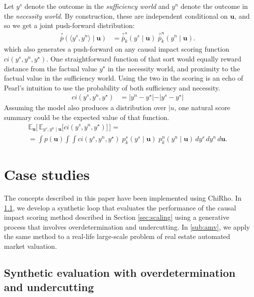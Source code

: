 \documentclass[anon,12pt]{clear2025} %
\begin{document}
Let $y^s$ denote the outcome in the \emph{sufficiency world} and $y^n$ denote the outcome in the \emph{necessity world}. By construction, these are independent conditional on $\mathbf{u}$, and so we get a joint push-forward distribution:
\begin{align}
\overset{?}{p}(\langle y^s, y^n \rangle \mid \mathbf{u})  & = \overset{?}{p}^s_k(y^s \mid \mathbf{u}) \; \overset{?}{p}^n_k(y^n \mid \mathbf{u}).
\end{align}
\noindent which also generates a push-forward on any causal impact scoring function $ci(y^s, y^n, y^\star)$.  One straightforward function of that sort would equally reward distance from the factual value $y^\star$ in the necessity world, and proximity to the factual value in the sufficiency world. Using the two in the scoring is an echo of Pearl's intuition to use the probability of both sufficiency and necessity.
\begin{align*}
ci(y^s, y^n, y^\star) & = \vert y^n - y^\star \vert   - \vert y^s - y ^\star \vert     
\end{align*}
Assuming the model also produces a distribution over $\vert{u}$, one natural score summary could be the expected value of that function.
\begin{align}\label{eq:score}
\mathbb{E}_{\mathbf{u}}\Big[\, \mathbb{E}_{y^s, y^n \mid \mathbf{u}} \big[ ci(y^s, y^n, y^\star) \big] \,\Big]
= \\  =\int p(\mathbf{u}) 
   \int \int ci(y^s, y^n, y^\star) \; p^s_k(y^s \mid \mathbf{u}) \; p^n_k(y^n \mid \mathbf{u}) 
   \, dy^s \, dy^n \, d\mathbf{u}. \nonumber
\end{align}






\section{Case studies}
\label{sec:case_studies}


The concepts described in this paper have been implemented using ChiRho.  In \ref{sub:synthetic}, we develop a synthetic loop that evaluates the performance of the causal impact scoring method described in Section \ref{sec:scaling} using a generative process that involves overdetermination and undercutting. In \ref{sub:amv}, we apply the same method to a real-life large-scale problem of real estate automated market valuation.



\subsection{Synthetic evaluation with overdetermination and undercutting}
\label{sub:synthetic}
\end{document}
